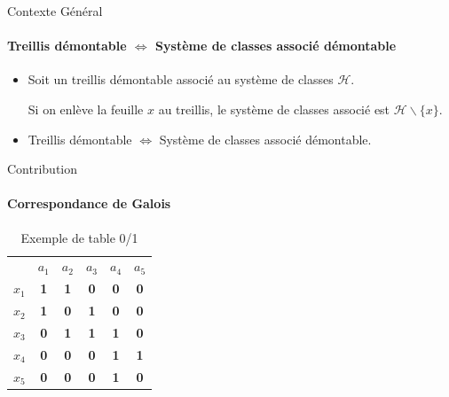 \documentclass{beamer}
\begin{document}
  \begin{frame}{Contexte Général}
  \framesubtitle{Treillis démontable $\Leftrightarrow$ Système de classes associé démontable}
\begin{itemize}
 \item   Soit un treillis démontable associé au système de classes $\mathcal{H}$.

  Si on enlève la feuille $x$ au treillis, le système de classes associé est $\mathcal{H} \backslash \{x\}$.
 \item Treillis démontable $\Leftrightarrow$ Système de classes associé démontable.
\end{itemize}


 
  \end{frame}
  \begin{frame}{Contribution}
  \framesubtitle{Correspondance de Galois}
\begin{table}[htb]
  \centering

\begin{tabular}{lccccc}
 & $a_1$ & $a_2$ & $a_3$ & $a_4$ & $a_5$\\
$x_1$ & \textbf{1} & \textbf{1} & \textbf{0} & \textbf{0} & \textbf{0}\\
$x_2$ & \textbf{1} & \textbf{0} & \textbf{1} & \textbf{0} & \textbf{0}\\
$x_3$ & \textbf{0} & \textbf{1} & \textbf{1} & \textbf{1} & \textbf{0}\\
$x_4$ & \textbf{0} & \textbf{0} & \textbf{0} & \textbf{1} & \textbf{1}\\
$x_5$ & \textbf{0} & \textbf{0} & \textbf{0} & \textbf{1} & \textbf{0}

\end{tabular}
\caption{Exemple de table 0/1  }
\end{table}
  \end{frame}
\end{document}

